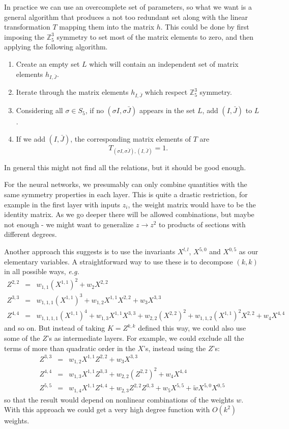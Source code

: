 \documentclass[12pt]{article}
\def\IZ{\mathbb{Z}}
\newcommand{\be}{\begin{equation}}
\newcommand{\ee}{\end{equation}}
\newcommand{\bea}{\begin{eqnarray}}
\newcommand{\eea}{\end{eqnarray}}
\begin{document}
{{{{In practice we can use an overcomplete set of parameters, so what we want is a general algorithm
that produces a not too redundant set along with the linear transformation $T$ mapping them into the matrix $h$.
This could be done by first imposing the $\IZ_5^3$ symmetry to set most of the matrix elements to zero,
and then applying the following algorithm.
\begin{enumerate}
\item Create an empty set $L$ which will contain an independent set of matrix elements $h_{I,\bar J}$.
\item Iterate through the matrix elements $h_{I,\bar J}$ which respect $\IZ_5^3$ symmetry.
\item Considering all $\sigma\in S_5$, if no $(\sigma I,\sigma \bar J)$ appears in the set $L$, add $(I,\bar J)$ to $L$.
\item If we add $(I,\bar J)$, the corresponding matrix elements of $T$ are
\be
T_{(\sigma I,\sigma \bar J),(I,\bar J)} = 1 .
\ee
\end{enumerate}
In general this might not find all the relations, but it should be good enough.

For the neural networks, we presumably can only combine quantities with the same symmetry properties
in each layer.  This is quite a drastic restriction, for example in the first layer with inputs $z_i$, the
weight matrix would have to be the identity matrix.  As we go deeper there will be allowed combinations,
but maybe not enough - we might want to generalize $z\rightarrow z^2$ to products of sections with
different degrees.

Another approach this suggests is to use the invariants $X^{l,l}$, $X^{5,0}$ and $X^{0,5}$
as our elementary variables.  A straightforward way to use these is to decompose $(k,k)$ in all possible ways, {\it e.g.}
\bea
Z^{2,2} &=& w_{1,1} (X^{1,1})^2 + w_2 X^{2,2} \\
Z^{3,3} &=& w_{1,1,1} (X^{1,1})^3 + w_{1,2} X^{1,1} X^{2,2} + w_3 X^{3,3} \\
Z^{4,4} &=& w_{1,1,1,1} (X^{1,1})^4 + w_{1,3} X^{1,1} X^{3,3} + w_{2,2} (X^{2,2})^2 +
 w_{1,1,2} (X^{1,1})^2 X^{2,2}+ w_4 X^{4,4} 
\eea
and so on.  But instead of taking $K=Z^{k,k}$ defined this way, we could also use some of the $Z$'s
as intermediate layers.  For example, we could exclude all the terms of more than quadratic order
in the $X$'s, instead using the $Z$'s:
\bea
Z^{3,3} &=& w_{1,2} X^{1,1} Z^{2,2} + w_3 X^{3,3} \\
Z^{4,4} &=& w_{1,3} X^{1,1} Z^{3,3} + w_{2,2} (Z^{2,2})^2 + w_4 X^{4,4} \\
Z^{5,5} &=& w_{1,4} X^{1,1} Z^{4,4} + w_{2,3} Z^{2,2} Z^{3,3} + w_5 X^{5,5} + \tilde w X^{5,0} X^{0,5}
\eea
so that the result would depend on nonlinear combinations of the weights $w$.
With this approach we could get a very high degree function with $O(k^2)$ weights.

}}}}
\end{document}
